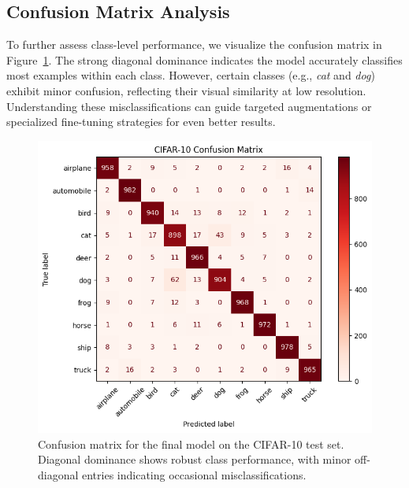 \documentclass[letterpaper]{article}
\begin{document}
\subsection{Confusion Matrix Analysis}
To further assess class-level performance, we visualize the confusion matrix in Figure~\ref{fig:conf_matrix}. The strong diagonal dominance indicates the model accurately classifies most examples within each class. However, certain classes (e.g., \emph{cat} and \emph{dog}) exhibit minor confusion, reflecting their visual similarity at low resolution. Understanding these misclassifications can guide targeted augmentations or specialized fine-tuning strategies for even better results.
\begin{figure}[ht]
    \centering
    \includegraphics[width=0.8\linewidth]{images/conf_matrix.png}
    \caption{Confusion matrix for the final model on the CIFAR-10 test set. Diagonal dominance shows robust class performance, with minor off-diagonal entries indicating occasional misclassifications.}
    \label{fig:conf_matrix}
\end{figure}
\end{document}

